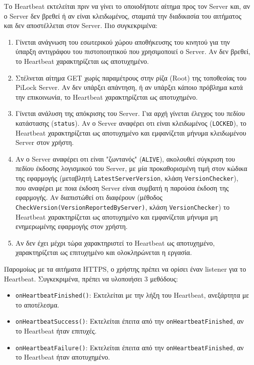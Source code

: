 	Το Heartbeat εκτελείται πριν να γίνει το οποιοδήποτε αίτημα προς τον Server και, αν ο Server δεν βρεθεί ή αν είναι κλειδωμένος, σταματά την διαδικασία του αιτήματος και δεν αποστέλλεται στον Server. Πιο συγκεκριμένα:
	\begin{enumerate}
		\item Γίνεται ανάγνωση του εσωτερικού χώρου αποθήκευσης του κινητού για την ύπαρξη αντιγράφου του πιστοποιητικού που χρησιμοποιεί ο Server. Αν δεν βρεθεί, το Heartbeat χαρακτηρίζεται ως αποτυχημένο.
		\item Στέλνεται αίτημα GET χωρίς παραμέτρους στην ρίζα (Root) της τοποθεσίας του PiLock Server. Αν δεν υπάρξει απάντηση, ή αν υπάρξει κάποιο πρόβλημα κατά την επικοινωνία, το Heartbeat χαρακτηρίζεται ως αποτυχημένο.
		\item Γίνεται ανάλυση της απόκρισης του Server. Για αρχή γίνεται έλεγχος του πεδίου κατάστασης (\verb|status|). Αν ο Server αναφέρει οτι είναι κλειδωμένος (\verb|LOCKED|), το Heartbeat χαρακτηρίζεται ως αποτυχημένο και εμφανίζεται μήνυμα κλειδωμένου Server στον χρήστη. 
		\item Αν ο Server αναφέρει οτι είναι "ζωντανός" (\verb|ALIVE|), ακολουθεί σύγκριση του πεδίου έκδοσης λογισμικού του Server, με μία προκαθορισμένη τιμή στον κώδικα της εφαρμογής (μεταβλητή \verb|LatestServerVersion|, κλάση \verb|VersionChecker|), που αναφέρει με ποια έκδοση Server είναι συμβατή η παρούσα έκδοση της εφαρμογής. Αν διαπιστώθεί οτι διαφέρουν (μέθοδος \verb|CheckVersion(VersionReportedByServer)|, κλάση \verb|VersionChecker|) το Heartbeat χαρακτηρίζεται ως αποτυχημένο και εμφανίζεται μήνυμα μη ενημερωμένης εφαρμογής στον χρήστη. 
		\item Αν δεν έχει μέχρι τώρα χαρακτηριστεί το Heartbeat ως αποτυχημένο, χαρακτηρίζεται ως επιτυχημένο και ολοκληρώνεται η εργασία.
	\end{enumerate}

	Παρομοίως με τα αιτήματα HTTPS, ο χρήστης πρέπει να ορίσει έναν listener για το Heartbeat. Συγκεκριμένα, πρέπει να υλοποιήσει 3 μεθόδους:

	\begin{itemize}
		\item \verb|onHeartbeatFinished()|: Εκτελείται με την λήξη του Heartbeat, ανεξάρτητα με το αποτέλεσμα.
		\item \verb|onHeartbeatSuccess()|: Εκτελείται έπειτα από την \verb|onHeartbeatFinished|, αν το Heartbeat ήταν επιτυχές.
		\item \verb|onHeartbeatFailure()|: Εκτελείται έπειτα από την \verb|onHeartbeatFinished|, αν το Heartbeat ήταν αποτυχημένο.
	\end{itemize}

